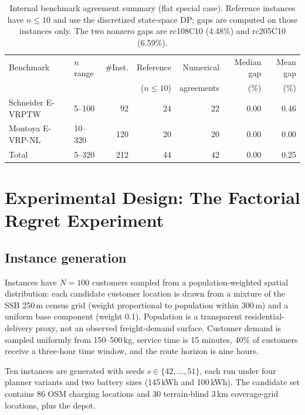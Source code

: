 \documentclass[review,3p,authoryear]{elsarticle}
\begin{document}
\begin{table}[ht]
\centering
\caption{Internal benchmark agreement summary (flat special case).
Reference instances have $n \le 10$ and use the discretized state-space
DP; gaps are computed on those instances only.  The two nonzero gaps
are rc108C10 (4.48\%) and rc205C10 (6.59\%).}
\label{tab:bench}
\footnotesize
\setlength{\tabcolsep}{4.5pt}
\begin{tabular}{llrrrrr}
\toprule
Benchmark & $n$ range & \#Inst. & Reference & Numerical & Median gap & Mean gap \\
          &           &         & ($n \le 10$) & agreements & (\%) & (\%) \\
\midrule
Schneider E-VRPTW & 5--100  & 92  & 24 & 22 & 0.00 & 0.46 \\
Montoya E-VRP-NL  & 10--320 & 120 & 20 & 20 & 0.00 & 0.00 \\
\midrule
Total             & 5--320  & 212 & 44 & 42 & 0.00 & 0.25 \\
\bottomrule
\end{tabular}
\end{table}

\section{Experimental Design: The Factorial Regret Experiment}
\label{sec:experiment}

\subsection{Instance generation}
\label{sec:instances}

Instances have $N = 100$ customers sampled from a population-weighted
spatial distribution: each candidate customer location is drawn from a
mixture of the SSB 250\,m census grid (weight proportional to population
within 300\,m) and a uniform base component (weight 0.1).  Population is a
transparent residential-delivery proxy, not an observed freight-demand
surface.  Customer demand is sampled uniformly from 150--500\,kg, service
time is 15 minutes, 40\% of customers receive a three-hour time window, and
the route horizon is nine hours.

Ten instances are generated with seeds $s \in \{42, \ldots, 51\}$, each
run under four planner variants and two battery sizes (145\,kWh and
100\,kWh).  The candidate set contains 86 OSM charging locations and
30 terrain-blind 3\,km coverage-grid locations, plus the depot.
\end{document}

